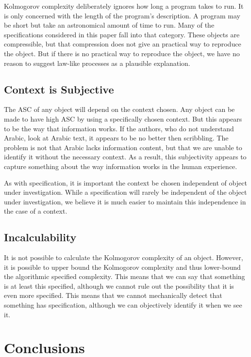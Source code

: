 Kolmogorov complexity deliberately ignores how long a program takes to run.
It is only concerned with the length of the program's description.
A program may be short but take an astronomical amount of time to run.
Many of the specifications considered in this paper fall into that category.
These objects are compressible, but that compression does not give an practical way to reproduce the object.
But if there is no practical way to reproduce the object, we have no reason to suggest law-like processes as a plausible explanation.

\subsection{Context is Subjective}

The ASC of any object will depend on the context chosen.
Any object can be made to have high ASC by using a specifically chosen context.
But this appears to be the way that information works.
If the authors, who do not understand Arabic, look at Arabic text, it appears to be no better then scribbling.
The problem is not that Arabic lacks information content, but that we are unable to identify it without the necessary context.
As a result, this subjectivity appears to capture something about the way information works in the human experience.

As with specification, it is important the context be chosen independent of object under investigation.
While a specification will rarely be independent of the object under investigation, we believe it is much easier to maintain this independence in the case of a context.

\subsection{Incalculability}

It is not possible to calculate the Kolmogorov complexity of an object.
However, it is possible to upper bound the Kolmogorov complexity and thus lower-bound the algorithmic specified complexity.
This means that we can say that something is at least this specified, although we cannot rule out the possibility that it is even more specified.
This means that we cannot mechanically detect that something has specification, although we can objectively identify it when we see it.

\section{Conclusions}

